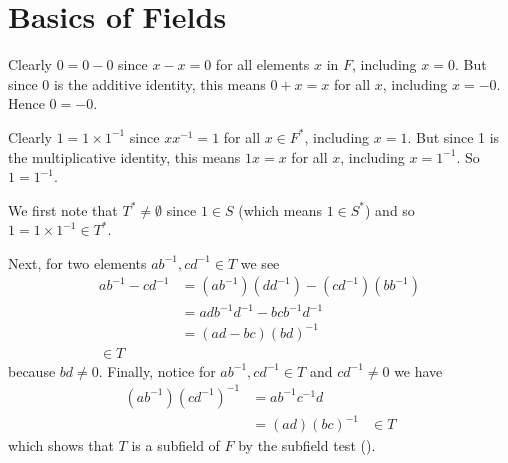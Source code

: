 \section{Basics of Fields}
\begin{questions}
    \item \begin{partquestions}{\alph*}
        \item Clearly $0 = 0 - 0$ since $x - x = 0$ for all elements $x$ in $F$, including $x = 0$. But since 0 is the additive identity, this means $0 + x = x$ for all $x$, including $x = -0$. Hence $0 = -0$.
        \item Clearly $1 = 1\times 1^{-1}$ since $xx^{-1} = 1$ for all $x \in F^\ast$, including $x = 1$. But since 1 is the multiplicative identity, this means $1x = x$ for all $x$, including $x = 1^{-1}$. So $1 = 1^{-1}$.
    \end{partquestions}

    \item We first note that $T^\ast \neq \emptyset$ since $1 \in S$ (which means $1 \in S^\ast$) and so $1 = 1 \times 1^{-1} \in T^\ast$.
    
    Next, for two elements $ab^{-1}, cd^{-1} \in T$ we see
    \begin{align*}
        ab^{-1} - cd^{-1} &= (ab^{-1})(dd^{-1}) - (cd^{-1})(bb^{-1})\\
        &= adb^{-1}d^{-1} - bcb^{-1}d^{-1}\\
        &= (ad-bc)(bd)^{-1}\\
        \in T
    \end{align*}
    because $bd \neq 0$. Finally, notice for $ab^{-1}, cd^{-1} \in T$ and $cd^{-1} \neq 0$ we have
    \begin{align*}
        (ab^{-1})(cd^{-1})^{-1} &= ab^{-1}c^{-1}d\\
        &= (ad)(bc)^{-1}
        &\in T
    \end{align*}
    which shows that $T$ is a subfield of $F$ by the subfield test ().
\end{questions}
